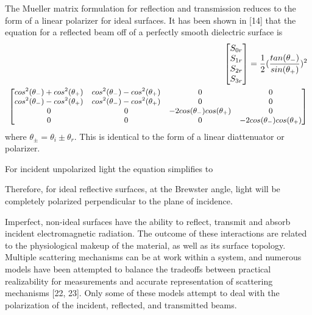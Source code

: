 
The Mueller matrix formulation for reflection and transmission reduces to the form of a linear polarizer for ideal surfaces.  It has been shown in [14] that the equation for a reflected beam off of a perfectly smooth dielectric surface is
%
\begin{align}
    \begin{split}
    \begin{bmatrix}
        S_{0r} \\
        S_{1r} \\
        S_{2r} \\
        S_{3r}
    \end{bmatrix}
    =
    \frac{1}{2}(\frac{tan(\theta_{-})}{sin(\theta_{+})})^2 \\
    \small
    \begin{bmatrix}
       cos^2(\theta_{-}) + cos^2(\theta_{+}) & cos^2(\theta_{-}) - cos^2(\theta_{+}) & 0 & 0 \\
        cos^2(\theta_{-}) - cos^2(\theta_{+}) & cos^2(\theta_{-}) - cos^2(\theta_{+}) & 0 & 0 \\
        0 & 0 & -2cos(\theta_{-})cos(\theta_{+}) & 0 \\
        0 & 0 & 0 & -2cos(\theta_{-})cos(\theta_{+})
    \end{bmatrix}
    \end{split}
\end{align}
%
where $\theta_{\pm}=\theta_i \pm \theta_r$. This is identical to the form of a linear diattenuator or polarizer.

For incident unpolarized light the equation simplifies to
%

%
Therefore, for ideal reflective surfaces, at the Brewster angle, light will be completely polarized perpendicular to the plane of incidence.

Imperfect, non-ideal surfaces have the ability to reflect, transmit and absorb incident electromagnetic radiation.  The outcome of these interactions are related to the physiological makeup of the material, as well as its surface topology.  Multiple scattering mechanisms can be at work within a system, and numerous models have been attempted to balance the tradeoffs between practical realizability for measurements and accurate representation of scattering mechanisms [22, 23].  Only some of these models attempt to deal with the polarization of the incident, reflected, and transmitted beams.
